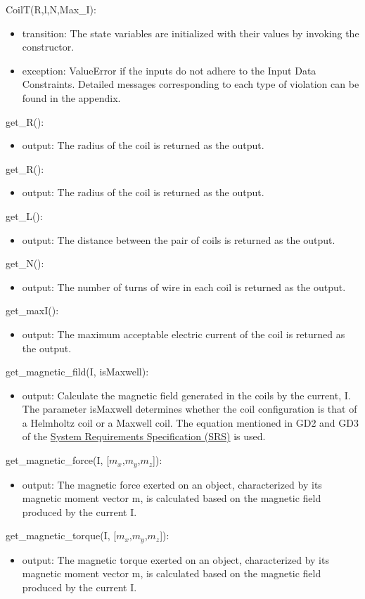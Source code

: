 \documentclass[12pt, titlepage]{article}
\begin{document}
\noindent CoilT(R,l,N,Max\_I):
\begin{itemize}
\item transition: The state variables are initialized with their values by invoking the constructor.
\item exception: ValueError if the inputs do not adhere to the Input Data Constraints. Detailed messages corresponding to each type of violation can be found in the appendix.
\end{itemize}

\noindent get\_R():
\begin{itemize}
\item output: The radius of the coil is returned as the output.
\end{itemize}

\noindent get\_R():
\begin{itemize}
\item output: The radius of the coil is returned as the output.
\end{itemize}
\noindent get\_L():
\begin{itemize}
\item output: The distance between the pair of coils is returned as the output.
\end{itemize}
\noindent get\_N():
\begin{itemize}
\item output: The number of turns of wire in each coil is returned as the output.
\end{itemize}
\noindent get\_maxI():
\begin{itemize}
\item output:  The maximum acceptable electric current of the coil is returned as the output.
\end{itemize}
\noindent get\_magnetic\_fild(I, isMaxwell):
\begin{itemize}
\item output: Calculate the magnetic field generated in the coils by the current, I. The parameter isMaxwell determines whether the coil configuration is that of a Helmholtz coil or a Maxwell coil. The equation mentioned in GD2 and GD3 of the \href{https://github.com/rnorouziani/3D-H3C/blob/main/docs/SRS/SRS.pdf}{System Requirements Specification (SRS)}  is used. 
\end{itemize}
\noindent get\_magnetic\_force(I, [$m_x$,$m_y$,$m_z$]):
\begin{itemize}
\item output: The magnetic force exerted on an object, characterized by its magnetic moment vector m, is calculated based on the magnetic field produced by the current I.
\end{itemize}
\noindent get\_magnetic\_torque(I, [$m_x$,$m_y$,$m_z$]):
\begin{itemize}
\item output: The magnetic torque exerted on an object, characterized by its magnetic moment vector m, is calculated based on the magnetic field produced by the current I.
\end{itemize}
\end{document}
